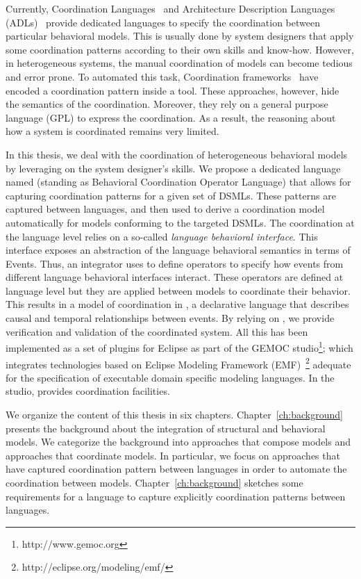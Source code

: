 Currently, Coordination Languages~\cite{coordsignibib} and Architecture Description Languages (ADLs)~\cite{frameadlsbib} provide dedicated languages to specify the coordination between particular behavioral models. This is usually done by system designers that apply some coordination patterns according to their own skills and know-how. However, in heterogeneous systems, the manual coordination of models can become tedious and error prone. To automated this task, Coordination frameworks~\cite{ptoleframebib,modhelxbib} have encoded a coordination pattern inside a tool. These approaches, however, hide the semantics of the coordination. Moreover, they rely on a general purpose language (GPL) to express the coordination. As a result, the reasoning about how a system is coordinated remains very limited.  
	
In this thesis, we deal with the coordination of heterogeneous behavioral models by leveraging on the system designer's skills. We propose a dedicated language named \bcool (standing as Behavioral Coordination Operator Language) that allows for capturing coordination patterns for a given set of DSMLs. These patterns are captured between languages, and then used to derive a coordination model automatically for models conforming to the targeted DSMLs. The coordination at the language level relies on a so-called \emph{language behavioral interface}. This interface exposes an abstraction of the language behavioral semantics in terms of Events. Thus, an integrator uses \bcool to define operators to specify how events from different language behavioral interfaces interact. These operators are defined at language level but they are applied between models to coordinate their behavior. This results in a model of coordination in \ccsl, a declarative language that describes causal and temporal relationships between events. By relying on \ccsl, we provide verification and validation of the coordinated system. All this has been implemented as a set of plugins for Eclipse as part of the GEMOC studio\footnote{http://www.gemoc.org}; which integrates technologies based on Eclipse Modeling Framework (EMF)~\footnote{http://eclipse.org/modeling/emf/} adequate for the specification of executable domain specific modeling languages. In the studio, \bcool provides coordination facilities.   

We organize the content of this thesis in six chapters. Chapter~\ref{ch:background} presents the background about the integration of structural and behavioral models. We categorize the background into approaches that compose models and approaches that coordinate models. In particular, we focus on approaches that have captured coordination pattern between languages in order to automate the coordination between models. Chapter~\ref{ch:background} sketches some requirements for a language to capture explicitly coordination patterns between languages.    

